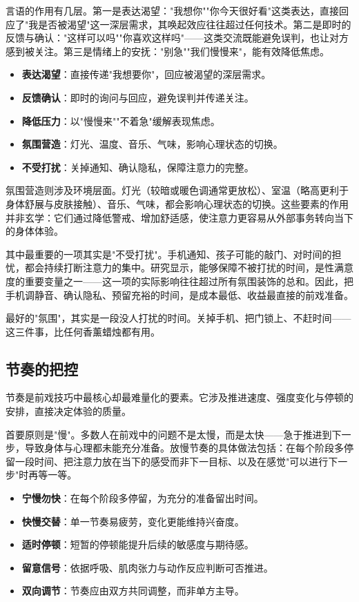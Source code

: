 \documentclass[12pt,UTF8]{ctexbook}
\newcommand{\keyword}[1]{\textbf{#1}}
\begin{document}
言语的作用有几层。第一是表达渴望："我想你""你今天很好看"这类表达，直接回应了"我是否被渴望"这一深层需求，其唤起效应往往超过任何技术。第二是即时的反馈与确认："这样可以吗""你喜欢这样吗"——这类交流既能避免误判，也让对方感到被关注。第三是情绪上的安抚："别急""我们慢慢来"，能有效降低焦虑。

\begin{itemize}
  \item \keyword{表达渴望}：直接传递"我想要你"，回应被渴望的深层需求。
  \item \keyword{反馈确认}：即时的询问与回应，避免误判并传递关注。
  \item \keyword{降低压力}：以"慢慢来""不着急"缓解表现焦虑。
  \item \keyword{氛围营造}：灯光、温度、音乐、气味，影响心理状态的切换。
  \item \keyword{不受打扰}：关掉通知、确认隐私，保障注意力的完整。
\end{itemize}

氛围营造则涉及环境层面。灯光（较暗或暖色调通常更放松）、室温（略高更利于身体舒展与皮肤接触）、音乐、气味，都会影响心理状态的切换。这些要素的作用并非玄学：它们通过降低警戒、增加舒适感，使注意力更容易从外部事务转向当下的身体体验。

其中最重要的一项其实是"不受打扰"。手机通知、孩子可能的敲门、对时间的担忧，都会持续打断注意力的集中。研究显示，能够保障不被打扰的时间，是性满意度的重要变量之一——这一项的实际影响往往超过所有氛围装饰的总和。因此，把手机调静音、确认隐私、预留充裕的时间，是成本最低、收益最直接的前戏准备。

\begin{tcolorbox}[colback=pink!5!white,colframe=red!50!black,title=贴心小叮咛]
最好的"氛围"，其实是一段没人打扰的时间。关掉手机、把门锁上、不赶时间——这三件事，比任何香薰蜡烛都有用。
\end{tcolorbox}
\subsection{节奏的把控}

节奏是前戏技巧中最核心却最难量化的要素。它涉及推进速度、强度变化与停顿的安排，直接决定体验的质量。

首要原则是"慢"。多数人在前戏中的问题不是太慢，而是太快——急于推进到下一步，导致身体与心理都未能充分准备。放慢节奏的具体做法包括：在每个阶段多停留一段时间、把注意力放在当下的感受而非下一目标、以及在感觉"可以进行下一步"时再等一等。

\begin{itemize}
  \item \keyword{宁慢勿快}：在每个阶段多停留，为充分的准备留出时间。
  \item \keyword{快慢交替}：单一节奏易疲劳，变化更能维持兴奋度。
  \item \keyword{适时停顿}：短暂的停顿能提升后续的敏感度与期待感。
  \item \keyword{留意信号}：依据呼吸、肌肉张力与动作反应判断可否推进。
  \item \keyword{双向调节}：节奏应由双方共同调整，而非单方主导。
\end{itemize}
\end{document}
